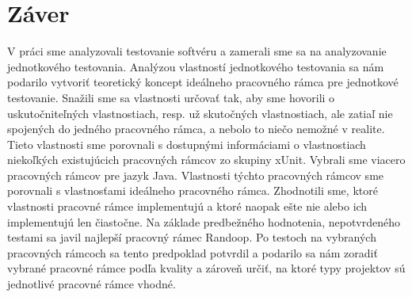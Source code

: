 \documentclass[11pt,twoside,slovak,a4paper]{article}
\begin{document}
	\section{Záver}
	V práci sme analyzovali testovanie softvéru a zamerali sme sa na analyzovanie jednotkového testovania. Analýzou vlastností jednotkového testovania sa nám podarilo vytvoriť teoretický koncept ideálneho pracovného rámca pre jednotkové testovanie. Snažili sme sa vlastnosti určovať tak, aby sme hovorili o uskutočniteľných vlastnostiach, resp. už skutočných vlastnostiach, ale zatiaľ nie spojených do jedného pracovného rámca, a nebolo to niečo nemožné v realite. Tieto vlastnosti sme porovnali s dostupnými informáciami o vlastnostiach niekoľkých existujúcich pracovných rámcov zo skupiny xUnit. Vybrali sme viacero pracovných rámcov pre jazyk Java. Vlastnosti týchto pracovných rámcov sme porovnali s vlastnosťami ideálneho pracovného rámca. Zhodnotili sme, ktoré vlastnosti pracovné rámce implementujú a ktoré naopak ešte nie alebo ich implementujú len čiastočne. Na základe predbežného hodnotenia, nepotvrdeného testami sa javil najlepší pracovný rámec Randoop. Po testoch na vybraných pracovných rámcoch sa tento predpoklad potvrdil a podarilo sa nám zoradiť vybrané pracovné rámce podľa kvality a zároveň určiť, na ktoré typy projektov sú jednotlivé pracovné rámce vhodné.

	
	
\end{document}
